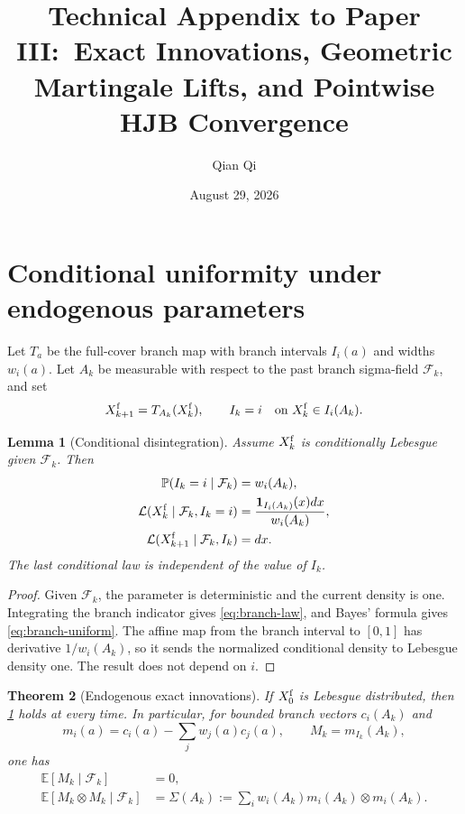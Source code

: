 \documentclass[11pt,reqno]{amsart}
\title{Technical Appendix to Paper III:\ Exact Innovations, Geometric Martingale Lifts, and Pointwise HJB Convergence}
\author{Qian Qi}
\date{August 29, 2026}
\newtheorem{theorem}{Theorem}[section]
\newtheorem{lemma}[theorem]{Lemma}
\theoremstyle{definition}
\newcommand{\E}{\mathbb E}
\newcommand{\Pp}{\mathbb P}
\newcommand{\F}{\mathcal F}
\begin{document}
\maketitle

\section{Conditional uniformity under endogenous parameters}

Let $T_a$ be the full-cover branch map with branch intervals $I_i(a)$ and
widths $w_i(a)$.  Let $A_k$ be measurable with respect to the past branch
sigma-field $\F_k$, and set
\[
 X_{k+1}^{\rm f}=T_{A_k}(X_k^{\rm f}),
 \qquad I_k=i\quad\text{on }X_k^{\rm f}\in I_i(A_k).
\]

\begin{lemma}[Conditional disintegration]\label{lem:disintegration}
Assume $X_k^{\rm f}$ is conditionally Lebesgue given $\F_k$.  Then
\begin{align}
 \Pp(I_k=i\mid\F_k)&=w_i(A_k),\label{eq:branch-law}\\
 \mathcal L(X_k^{\rm f}\mid\F_k,I_k=i)&=
 {\mathbf 1_{I_i(A_k)}(x)dx\over w_i(A_k)},\label{eq:branch-uniform}\\
 \mathcal L(X_{k+1}^{\rm f}\mid\F_k,I_k)&=dx.\label{eq:image-uniform}
\end{align}
The last conditional law is independent of the value of $I_k$.
\end{lemma}

\begin{proof}
Given $\F_k$, the parameter is deterministic and the current density is one.
Integrating the branch indicator gives \eqref{eq:branch-law}, and Bayes'
formula gives \eqref{eq:branch-uniform}.  The affine map from the branch
interval to $[0,1]$ has derivative $1/w_i(A_k)$, so it sends the normalized
conditional density to Lebesgue density one.  The result does not depend on
$i$.
\end{proof}

\begin{theorem}[Endogenous exact innovations]\label{thm:endogenous-innovation}
If $X_0^{\rm f}$ is Lebesgue distributed, then
\cref{lem:disintegration} holds at every time.  In particular, for bounded
branch vectors $c_i(A_k)$ and
\[
 m_i(a)=c_i(a)-\sum_jw_j(a)c_j(a),
 \qquad M_k=m_{I_k}(A_k),
\]
one has
\begin{align}
 \E[M_k\mid\F_k]&=0,\label{eq:MD}\\
 \E[M_k\otimes M_k\mid\F_k]
 &=\Sigma(A_k):=\sum_iw_i(A_k)m_i(A_k)\otimes m_i(A_k).
 \label{eq:bracket}
\end{align}
\end{theorem}
\end{document}
